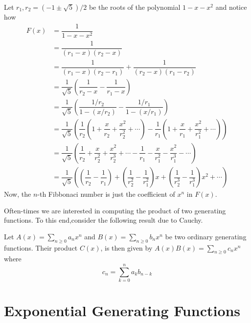 \begin{solution}
Let $r_1,r_2 = (-1\pm\sqrt{5})/2$ be the roots of the polynomial $1-x-x^2$ and notice how
\begin{align*}
    F(x) &= \dfrac{1}{1-x-x^2} \\
    &= \dfrac{1}{(r_1-x)(r_2-x)} \\
    &= \dfrac{1}{(r_1-x)(r_2-r_1)}+\dfrac{1}{(r_2-x)(r_1-r_2)} \\
    &= \dfrac{1}{\sqrt{5}}\left(\dfrac{1}{r_2-x}-\dfrac{1}{r_1-x}\right) \\
    &= \dfrac{1}{\sqrt{5}} \left(\dfrac{1/r_2}{1-(x/r_2)}-\dfrac{1/r_1}{1-(x/r_1)}\right) \\
    &= \dfrac{1}{\sqrt{5}} \left(\dfrac{1}{r_2}\left(1+\dfrac{x}{r_2}+\dfrac{x^2}{r_2^2}+\cdots\right)-\dfrac{1}{r_1}\left(1+\dfrac{x}{r_1}+\dfrac{x^2}{r_1^2}+\cdots\right)\right) \\
    &= \dfrac{1}{\sqrt{5}}\left(\dfrac{1}{r_2}+\dfrac{x}{r_2^2}+\dfrac{x^2}{r_2^3}+\cdots - \dfrac{1}{r_1}-\dfrac{x}{r_1^2}-\dfrac{x^2}{r_1^3}-\cdots\right) \\
    &= \dfrac{1}{\sqrt{5}}\left(\left(\dfrac{1}{r_2}-\dfrac{1}{r_1}\right)+\left(\dfrac{1}{r_2^2}-\dfrac{1}{r_1^2}\right)x+\left(\dfrac{1}{r_2^3}-\dfrac{1}{r_1^3}\right)x^2+\cdots\right)
\end{align*}
Now, the $n$-th Fibbonaci number is just the coefficient of $x^n$ in $F(x)$. 
\end{solution}
Often-times we are interested in computing the product of two generating functions. To this end,consider the following result due to Cauchy. 
\begin{claim}
Let $A(x) = \sum_{n\geq 0}a_nx^n$ and $B(x)=\sum_{n\geq 0}b_nx^n$ be two ordinary generating functions. Their product $C(x)$, is then given by $A(x)B(x)=\sum_{n\geq 0}c_nx^n$ where \[
c_n = \sum_{k=0}^{n}a_kb_{n-k}
\]
\end{claim}
\section{Exponential Generating Functions}
\endinput